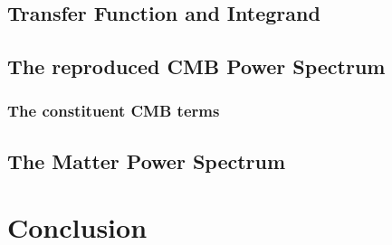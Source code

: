 \documentclass[10pt,a4paper]{article}
\begin{document}
\subsection{Transfer Function and Integrand}
\label{subsec:Results/Transfer and integrand}

\subsection{The reproduced CMB Power Spectrum}
\label{subsec:Results/CMB power spectrum}

\subsubsection{The constituent CMB terms}
\label{subsubsec:Results/CMB power spectrum terms}

\subsection{The Matter Power Spectrum}
\label{subsec:Results/Matter power spectrum}

\section{Conclusion}
\label{sec:Conclusion}


\end{document}
